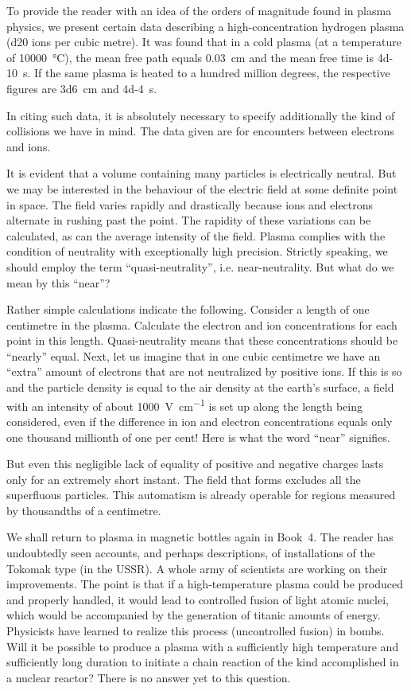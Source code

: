 To provide the reader with an idea of the orders of magnitude found in plasma physics, we present certain data describing a high-concentration hydrogen plasma (\num{d20} ions per cubic metre). It was found that in a cold plasma (at a temperature of \SI{10000}{\celsius}), the mean free path equals \SI{0.03}{\centi\meter} and the mean free time is \SI{4d-10}{\second}. If the same plasma is heated to a hundred million degrees, the respective figures are \SI{3d6}{\centi\meter} and \SI{4d-4}{\second}.

In citing such data, it is absolutely necessary to specify additionally the kind of collisions we have in mind. The data given are for encounters between electrons and ions.

It is evident that a volume containing many particles is electrically neutral. But we may be interested in the behaviour of the electric field at some definite point in space. The field varies rapidly and drastically because ions and electrons alternate in rushing past the point. The rapidity of these variations can be calculated, as can the average intensity of the field. Plasma complies with the condition of neutrality with exceptionally high precision. Strictly speaking, we should employ the term ``quasi-neutrality'', i.e. near-neutrality. But what do we mean by this ``near''?

Rather simple calculations indicate the following. Consider a length of one centimetre in the plasma. Calculate the electron and ion concentrations for each point in this length. Quasi-neutrality means that these concentrations should be ``nearly'' equal. Next, let us imagine that in one cubic centimetre we have an ``extra'' amount of electrons that are not neutralized by positive ions. If this is so and the particle density is equal to the air density at the earth's surface, a field with an intensity of about \SI{1000}{\volt\per\centi\meter} is set up along the length being considered, even if the difference in ion and electron concentrations equals only one thousand millionth of one per cent! Here is what the word ``near'' signifies.

But even this negligible lack of equality of positive and negative charges lasts only for an extremely short instant. The field that forms excludes all the superfluous particles. This automatism is already operable for regions measured by thousandths of a centimetre.

We shall return to plasma in magnetic bottles again in Book~4. The reader has undoubtedly seen accounts, and perhaps descriptions, of installations of the Tokomak type (in the USSR). A whole army of scientists are working on their improvements. The point is that if a high-temperature plasma could be produced and properly handled, it would lead to controlled fusion of light atomic nuclei, which would be accompanied by the generation of titanic amounts of energy. Physicists have learned to realize this process (uncontrolled fusion) in bombs. Will it be possible to produce a plasma with a sufficiently high temperature and sufficiently long duration to initiate a chain reaction of the kind accomplished in a nuclear reactor? There is no answer yet to this question.


